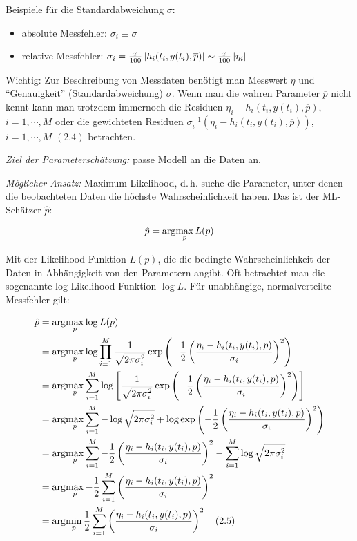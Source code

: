 Beispiele für die Standardabweichung $\sigma:$

\begin{itemize}
\item absolute Messfehler: $\sigma_i \equiv \sigma$
\item relative Messfehler: $\sigma_i =  \frac x{100} \left| h_i(t_i,y(t_i),\overline p) \right| \sim \frac x{100} \left|\eta_i\right|$
\end{itemize}

Wichtig: Zur Beschreibung von Messdaten benötigt man Messwert $\eta$ und "`Genauigkeit"' (Standardabweichung) $\sigma$. Wenn man die wahren Parameter $\overline p$ nicht kennt kann man trotzdem immernoch die Residuen $\eta_i-h_i(t_i,y(t_i), \overline p)$, $i=1,\cdots,M$ oder die gewichteten Residuen $\sigma_i^{-1}(\eta_i-h_i(t_i,y(t_i), \overline p))$, $i=1,\cdots,M$ $(2.4)$  betrachten.

\emph{Ziel der Parameterschätzung:} passe Modell an die Daten an.

\emph{Möglicher Ansatz:} Maximum Likelihood, d.\,h. suche die Parameter, unter denen die beobachteten Daten die höchste Wahrscheinlichkeit haben. Das ist der ML-Schätzer $\hat p$:

\[\hat p = \arg\!\max_p L(p)\]

Mit der Likelihood-Funktion $L(p)$, die die bedingte Wahrscheinlichkeit der Daten in Abhängigkeit von den Parametern angibt. Oft betrachtet man die sogenannte log-Likelihood-Funktion $\log L$. Für unabhängige, normalverteilte Messfehler gilt:

\begin{align*}
\hat p &= \arg\!\max_p \log L(p)\\
&= \arg\!\max_p \log \prod_{i=1}^M \frac 1{\sqrt{2\pi \sigma_i^2}} \exp\left( -\frac 12 \left(\frac{\eta_i-h_i(t_i,y(t_i),p)}{\sigma_i} \right)^2 \right) \\
&= \arg\!\max_p \sum_{i=1}^M \log \left[\frac 1{\sqrt{2\pi \sigma_i^2}} \exp\left( -\frac 12 \left(\frac{\eta_i-h_i(t_i,y(t_i),p)}{\sigma_i} \right)^2 \right)\right] \\
&= \arg\!\max_p \sum_{i=1}^M -\log \sqrt{2\pi \sigma_i^2} + \log \exp\left( -\frac 12 \left(\frac{\eta_i-h_i(t_i,y(t_i),p)}{\sigma_i} \right)^2 \right) \\
&= \arg\!\max_p \sum_{i=1}^M -\frac 12 \left(\frac{\eta_i-h_i(t_i,y(t_i),p)}{\sigma_i} \right)^2 - \sum_{i=1}^M \log \sqrt{2\pi \sigma_i^2} \\
&= \arg\!\max_p - \frac 12 \sum_{i=1}^M \left(\frac{\eta_i-h_i(t_i,y(t_i),p)}{\sigma_i} \right)^2 \\
&= \arg\!\min_p \frac 12 \sum_{i=1}^M \left(\frac{\eta_i-h_i(t_i,y(t_i),p)}{\sigma_i} \right)^2 \quad (2.5)\\
\end{align*}

